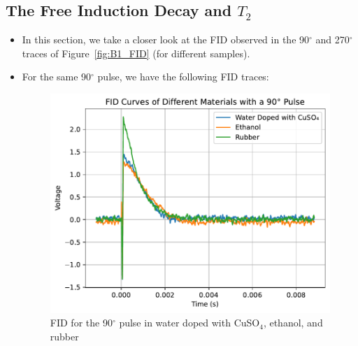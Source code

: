 \documentclass{article}
\newcommand{\degree}{$^{\circ}$ }
\begin{document}
\subsection{The Free Induction Decay and $T_2$}\label{subsec:the-free-induction-decay-and-$t_2$}
\begin{itemize}
    \item In this section, we take a closer look at the FID observed in the 90\degree and 270\degree traces of Figure~\ref{fig:B1_FID} (for different samples).
    \item For the same 90\degree pulse, we have the following FID traces:
    \begin{figure}[h]
        \centering
        \includegraphics[scale = 0.78]{./images/B2}
        \caption{FID for the 90$^{\circ}$ pulse in water doped with CuSO$_4$, ethanol, and rubber}
        \label{fig:B2_FID}
    \end{figure}
\end{itemize}
\end{document}
